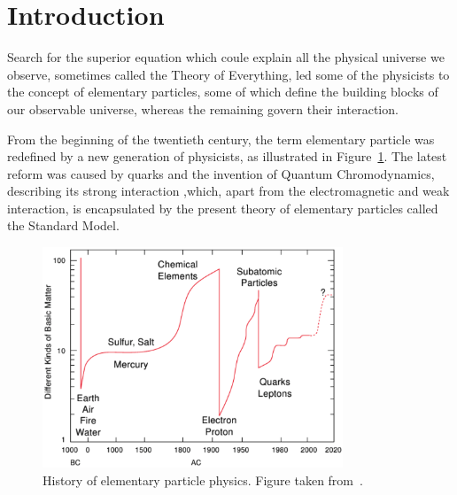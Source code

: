 \documentclass[a4paper,11pt,twoside,openright]{book}
\begin{document}
\clearpage
{}
\listoffigures

\cleardoublepage

\clearpage
{}
\setcounter{page}{1}

\chapter*{Introduction}

Search for the superior equation which coule explain all the physical universe
we observe, sometimes called the Theory of Everything, led some of the
physicists to the concept of elementary particles, some of which define the
building blocks of our observable universe, whereas the remaining govern their
interaction.

From the beginning of the twentieth century, the term elementary particle
was redefined by a new generation of physicists, as illustrated in
Figure~\ref{fig:HistoryOfElPartPhysics}. The latest reform was caused by quarks
and the invention of Quantum Chromodynamics, describing its strong interaction
,which, apart from the electromagnetic and weak interaction, is encapsulated
by the present theory of elementary particles called the Standard Model. 

\begin{figure}[t]
  \centering
  \includegraphics[width=0.8\textwidth]{Introduction/HistoryOfElementaryParticlePhysics.png}
  \caption[History of elementary particle physics.]{History of elementary
    particle physics. Figure taken from~\cite{LatticeQCDForPedestrians}.}
  \label{fig:HistoryOfElPartPhysics}
\end{figure}
\end{document}
